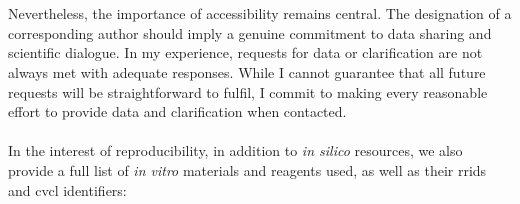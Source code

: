 \\
\\
Nevertheless, the importance of accessibility remains central. The designation of a corresponding author should imply a genuine commitment to data sharing and scientific dialogue. In my experience, requests for data or clarification are not always met with adequate responses. While I cannot guarantee that all future requests will be straightforward to fulfil, I commit to making every reasonable effort to provide data and clarification when contacted.
\\
\\
In the interest of reproducibility, in addition to \textit{in silico} resources, we also provide a full list of \textit{in vitro} materials and reagents used, as well as their \glspl{rrid} and \gls{cvcl} identifiers:
\begin{table}[H]
	\centering
	\caption[Key resources used in this study]{\textbf{Key resources used in this study}.}
	\scriptsize
	\newlength{\resourcetablewidth}
	\setlength{\resourcetablewidth}{\textwidth - 6\tabcolsep - 4\arrayrulewidth}
	

\end{table}
